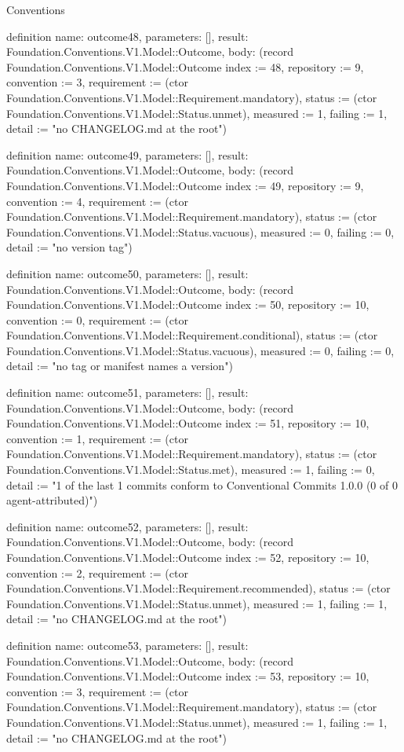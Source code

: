 \begin{lexlean}{Conventions}
\begin{semanticmodule}
definition{
  name: outcome48,
  parameters: [],
  result: Foundation.Conventions.V1.Model::Outcome,
  body: (record Foundation.Conventions.V1.Model::Outcome {index := 48, repository := 9, convention := 3, requirement := (ctor Foundation.Conventions.V1.Model::Requirement.mandatory), status := (ctor Foundation.Conventions.V1.Model::Status.unmet), measured := 1, failing := 1, detail := "no CHANGELOG.md at the root"})
}

definition{
  name: outcome49,
  parameters: [],
  result: Foundation.Conventions.V1.Model::Outcome,
  body: (record Foundation.Conventions.V1.Model::Outcome {index := 49, repository := 9, convention := 4, requirement := (ctor Foundation.Conventions.V1.Model::Requirement.mandatory), status := (ctor Foundation.Conventions.V1.Model::Status.vacuous), measured := 0, failing := 0, detail := "no version tag"})
}

definition{
  name: outcome50,
  parameters: [],
  result: Foundation.Conventions.V1.Model::Outcome,
  body: (record Foundation.Conventions.V1.Model::Outcome {index := 50, repository := 10, convention := 0, requirement := (ctor Foundation.Conventions.V1.Model::Requirement.conditional), status := (ctor Foundation.Conventions.V1.Model::Status.vacuous), measured := 0, failing := 0, detail := "no tag or manifest names a version"})
}

definition{
  name: outcome51,
  parameters: [],
  result: Foundation.Conventions.V1.Model::Outcome,
  body: (record Foundation.Conventions.V1.Model::Outcome {index := 51, repository := 10, convention := 1, requirement := (ctor Foundation.Conventions.V1.Model::Requirement.mandatory), status := (ctor Foundation.Conventions.V1.Model::Status.met), measured := 1, failing := 0, detail := "1 of the last 1 commits conform to Conventional Commits 1.0.0 (0 of 0 agent-attributed)"})
}

definition{
  name: outcome52,
  parameters: [],
  result: Foundation.Conventions.V1.Model::Outcome,
  body: (record Foundation.Conventions.V1.Model::Outcome {index := 52, repository := 10, convention := 2, requirement := (ctor Foundation.Conventions.V1.Model::Requirement.recommended), status := (ctor Foundation.Conventions.V1.Model::Status.unmet), measured := 1, failing := 1, detail := "no CHANGELOG.md at the root"})
}

definition{
  name: outcome53,
  parameters: [],
  result: Foundation.Conventions.V1.Model::Outcome,
  body: (record Foundation.Conventions.V1.Model::Outcome {index := 53, repository := 10, convention := 3, requirement := (ctor Foundation.Conventions.V1.Model::Requirement.mandatory), status := (ctor Foundation.Conventions.V1.Model::Status.unmet), measured := 1, failing := 1, detail := "no CHANGELOG.md at the root"})
}


\end{semanticmodule}
\end{lexlean}
